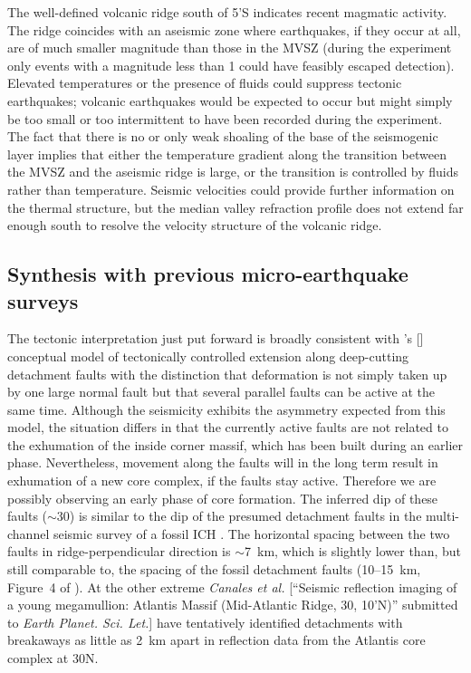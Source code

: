 \documentclass[jgr]{agu2001}
\newlength{\tw}
\begin{document}
\begin{article}
The well-defined volcanic ridge south of 5'S \citep{reston02} indicates recent magmatic
activity.  The ridge coincides with an aseismic zone where
earthquakes, if they occur at all, are of much smaller magnitude
than
those in the MVSZ (during the experiment only events with a magnitude
less than 1 could have feasibly escaped detection).  Elevated temperatures or the presence of fluids
could suppress tectonic earthquakes;  volcanic earthquakes would be
expected to occur but might simply be too small or too intermittent to
have been recorded during the experiment.  The fact that there is no
or only weak shoaling of the base of the seismogenic layer implies
that either the temperature gradient along the transition between the MVSZ
and the aseismic ridge is large, or the transition is controlled by
fluids rather than temperature.   Seismic velocities could provide
further information on the thermal structure, but the median valley
refraction profile does not extend far enough south to resolve the
velocity structure of the volcanic ridge.



\subsection{Synthesis with previous micro-earthquake surveys}

The tectonic interpretation just put forward is broadly consistent
with \citeauthor{tucholke94}'s [\citeyear{tucholke94}] conceptual
model of tectonically controlled extension along deep-cutting
detachment faults with the distinction that deformation is
not simply taken up by one large normal fault  but that several
parallel faults can be active at the same time.
Although the seismicity exhibits the asymmetry expected from this
model, the situation differs in that the currently active faults are
not related to the exhumation of the inside corner massif, which has
been built during an earlier phase. Nevertheless, movement along the
faults will in the long term result in exhumation of a new core
complex, if the faults stay active. Therefore we are possibly 
observing an early phase of core formation.
The inferred dip of
these faults ($\sim$30\dg) is similar to the dip of the presumed
detachment faults in the multi-channel seismic survey of a fossil ICH
\citep{ranero99}.  The horizontal spacing between the two faults in
ridge-perpendicular direction is $\sim$7~km, which is slightly lower
than, but still comparable to, the spacing of the fossil detachment
faults (10--15~km, Figure~4 of \citet{ranero99}). At the other extreme
{\it Canales et al.} [``Seismic reflection imaging of a young
megamullion: Atlantis Massif (Mid-Atlantic Ridge, 30\dg, 10'N)'' submitted to {\it Earth Planet. Sci. Let.}]
have tentatively identified detachments with breakaways as little as
2~km apart in reflection data from the Atlantis core complex at 30\dg N.


\end{article}
\end{document}
